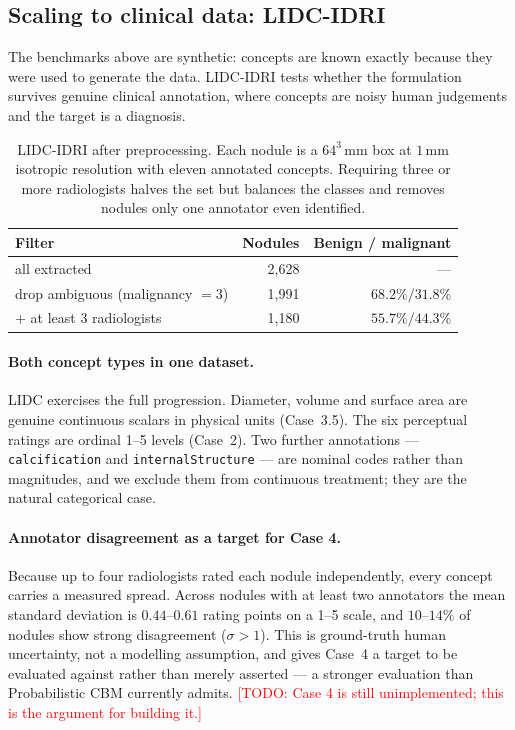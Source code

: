 \documentclass[11pt]{article}
\newcommand{\todo}[1]{\textcolor{red}{[TODO: #1]}}
\begin{document}
\subsection{Scaling to clinical data: LIDC-IDRI}
\label{sec:lidc}

The benchmarks above are synthetic: concepts are known exactly because they were
used to generate the data. LIDC-IDRI tests whether the formulation survives
genuine clinical annotation, where concepts are noisy human judgements and the
target is a diagnosis.

\begin{table}[t]
\centering
\caption{LIDC-IDRI after preprocessing. Each nodule is a $64^3$\,mm box at
$1$\,mm isotropic resolution with eleven annotated concepts. Requiring three or
more radiologists halves the set but balances the classes and removes nodules
only one annotator even identified.}
\label{tab:lidc}
\begin{tabular}{lrr}
\toprule
\textbf{Filter} & \textbf{Nodules} & \textbf{Benign / malignant} \\
\midrule
all extracted                      & 2{,}628 & --- \\
drop ambiguous (malignancy $=3$)   & 1{,}991 & $68.2\% / 31.8\%$ \\
\quad + at least 3 radiologists    & 1{,}180 & $55.7\% / 44.3\%$ \\
\bottomrule
\end{tabular}
\end{table}

\paragraph{Both concept types in one dataset.}
LIDC exercises the full progression. Diameter, volume and surface area are
genuine continuous scalars in physical units (Case~3.5). The six perceptual
ratings are ordinal 1--5 levels (Case~2). Two further annotations ---
\texttt{calcification} and \texttt{internalStructure} --- are nominal codes
rather than magnitudes, and we exclude them from continuous treatment; they are
the natural categorical case.

\paragraph{Annotator disagreement as a target for Case 4.}
Because up to four radiologists rated each nodule independently, every concept
carries a measured spread. Across nodules with at least two annotators the mean
standard deviation is $0.44$--$0.61$ rating points on a 1--5 scale, and
$10$--$14\%$ of nodules show strong disagreement ($\sigma > 1$). This is
ground-truth human uncertainty, not a modelling assumption, and gives Case~4 a
target to be evaluated against rather than merely asserted --- a stronger
evaluation than Probabilistic CBM \citep{kim2023probabilistic} currently
admits. \todo{Case 4 is still unimplemented; this is the argument for building
it.}
\end{document}
